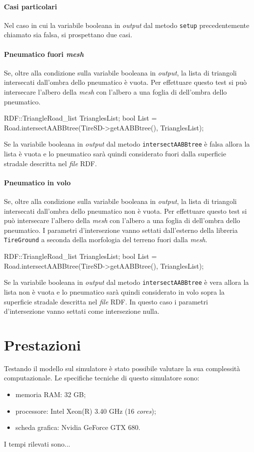 \paragraph{Casi particolari}
Nel caso in cui la variabile booleana in \textit{output} dal metodo \texttt{setup} precedentemente chiamato sia falsa, si prospettano due casi.
%
\paragraph{Pneumatico fuori \textit{mesh}} Se, oltre alla condizione sulla variabile booleana in \textit{output}, la lista di triangoli intersecati dall'ombra dello pneumatico è vuota. Per effettuare questo test si può intersecare l'albero della \textit{mesh} con l'albero a una foglia di dell'ombra dello pneumatico.
\begin{pseudoc}
	RDF::TriangleRoad_list TrianglesList;
	bool List = Road.intersectAABBtree(TireSD->getAABBtree(), TrianglesList);
\end{pseudoc}
Se la variabile booleana in \textit{output} dal metodo \texttt{intersectAABBtree} è falsa allora la lista è vuota e lo pneumatico sarà quindi considerato fuori dalla superficie stradale descritta nel \textit{file} \ac{RDF}.
%
\paragraph{Pneumatico in volo}
Se, oltre alla condizione sulla variabile booleana in \textit{output}, la lista di triangoli intersecati dall'ombra dello pneumatico non è vuota. Per effettuare questo test si può intersecare l'albero della \textit{mesh} con l'albero a una foglia di dell'ombra dello pneumatico. I parametri d'intersezione vanno settati dall'esterno della libreria \texttt{TireGround} a seconda della morfologia del terreno fuori dalla \textit{mesh}.
\begin{pseudoc}
	RDF::TriangleRoad_list TrianglesList;
	bool List = Road.intersectAABBtree(TireSD->getAABBtree(), TrianglesList);
\end{pseudoc}
Se la variabile booleana in \textit{output} dal metodo \texttt{intersectAABBtree} è vera allora la lista non è vuota e lo pneumatico sarà quindi considerato in volo sopra la superficie stradale descritta nel \textit{file} \ac{RDF}. In questo caso i parametri d'intersezione vanno settati come intersezione nulla.
%
\section{Prestazioni}
Testando il modello sul simulatore è stato possibile valutare la sua complessità computazionale. Le specifiche tecniche di questo simulatore sono:
\begin{itemize}
	\item memoria RAM: 32 GB;
	\item processore: Intel Xeon(R) 3.40 GHz (16 \textit{cores});
	\item scheda grafica: Nvidia GeForce GTX 680.
\end{itemize}

I tempi rilevati sono...

